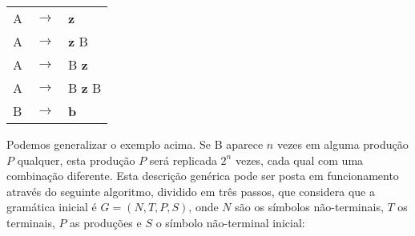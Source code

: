 \documentclass{compiladores}
\newcommand{\flech}{$\rightarrow$}
\begin{document}
\begin{center}
\begin{tabular}{lll}
A & \flech & {\bf z} \\
A & \flech & {\bf z} B \\
A & \flech & B {\bf z} \\
A & \flech & B {\bf z} B \\
B & \flech & {\bf b} \\
\end{tabular}
\end{center}

Podemos generalizar o exemplo acima.  Se B aparece $n$ vezes em alguma
produção $P$ qualquer, esta produção $P$ será replicada $2^n$ vezes,
cada qual com uma combinação diferente. Esta descrição genérica pode
ser posta em funcionamento através do seguinte algoritmo, dividido em
três passos, que considera que a gramática inicial é $G = (N, T, P,
S)$, onde $N$ são os símbolos não-terminais, $T$ os terminais, $P$ as
produções e $S$ o símbolo não-terminal inicial:
\end{document}
